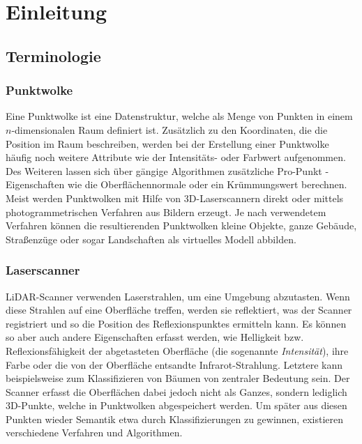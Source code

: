 
\chapter{Einleitung}

\section{Terminologie}


\subsection{Punktwolke}
Eine Punktwolke ist eine Datenstruktur, welche als Menge von Punkten in einem $n$-dimensionalen Raum definiert ist. Zusätzlich zu den Koordinaten, die die Position im Raum beschreiben, werden bei der Erstellung einer Punktwolke häufig noch weitere Attribute wie der Intensitäts- oder Farbwert aufgenommen. Des Weiteren lassen sich über gängige Algorithmen zusätzliche Pro-Punkt -Eigenschaften wie die Oberflächennormale \citep{Mitra.Nguyen-2003} oder ein Krümmungswert \citep{Ho.Gibbins-2009} berechnen. 
Meist werden Punktwolken mit Hilfe von 3D-Laserscannern direkt oder mittels photogrammetrischen Verfahren aus Bildern \citep{Remondino.ElHakim-2006} erzeugt. Je nach verwendetem Verfahren können die resultierenden Punktwolken kleine Objekte, ganze Gebäude, Straßenzüge oder sogar Landschaften als virtuelles Modell abbilden.

\subsection{Laserscanner}
LiDAR-Scanner \cite{Collis-1970} verwenden Laserstrahlen, um eine Umgebung abzutasten. Wenn diese Strahlen auf eine Oberfläche treffen, werden sie reflektiert, was der Scanner registriert und so die Position des Reflexionspunktes ermitteln kann. Es können so aber auch andere Eigenschaften erfasst werden, wie Helligkeit bzw. Reflexionsfähigkeit der abgetasteten Oberfläche (die sogenannte \textit{Intensität}), ihre Farbe oder die von der Oberfläche entsandte Infrarot-Strahlung. Letztere kann beispielsweise zum Klassifizieren von Bäumen von zentraler Bedeutung sein. Der Scanner erfasst die Oberflächen dabei jedoch nicht als Ganzes, sondern lediglich 3D-Punkte, welche in Punktwolken abgespeichert werden. Um später aus diesen Punkten wieder Semantik etwa durch Klassifizierungen zu gewinnen, existieren verschiedene Verfahren und Algorithmen.

